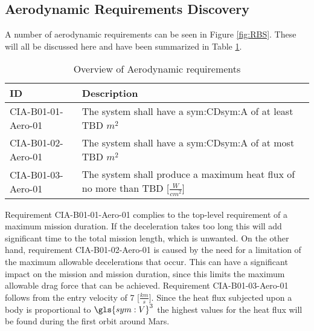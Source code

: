 \subsection{Aerodynamic Requirements Discovery} 
\label{sec:aero}
A number of aerodynamic requirements can be seen in Figure \ref{fig:RBS}. These will all be discussed here and have been summarized in Table \ref{tab:aeroreqs}. 


\begin{table}[h]
	\caption{Overview of Aerodynamic requirements}
	\label{tab:aeroreqs}
	\begin{tabular}{|p{}|p{}|}
		\hline
		ID & Description \\
		\hline \hline
		CIA-B01-01-Aero-01 & The system shall have a \gls{sym:CD}\gls{sym:A} of at least TBD $m^{2}$ \\ \hline
		CIA-B01-02-Aero-01 & The system shall have a \gls{sym:CD}\gls{sym:A} of at most TBD $m^{2}$ \\ \hline
		CIA-B01-03-Aero-01 & The system shall produce a maximum heat flux of no more than TBD [$\frac{W}{cm^{2}}$] \\ \hline
	\end{tabular}
\end{table}
Requirement CIA-B01-01-Aero-01 complies to the top-level requirement of a maximum mission duration. If the deceleration takes too long this will add significant time to the total mission length, which is unwanted.
On the other hand, requirement CIA-B01-02-Aero-01 is caused by the need for a limitation of the maximum allowable decelerations that occur. This can have a significant impact on the mission and mission duration, since this limits the maximum allowable drag force that can be achieved.
Requirement CIA-B01-03-Aero-01 follows from the entry velocity of 7 [$\frac{km}{s}$]. Since the heat flux subjected upon a body is proportional to $\gls{sym:V}^{3}$ \cite{Tauber1986} the highest values for the heat flux will be found during the first orbit around Mars. 